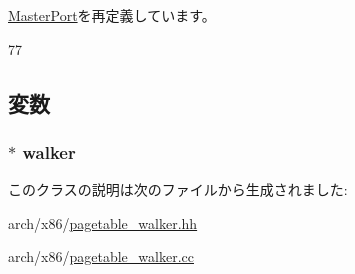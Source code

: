 \hyperlink{classMasterPort_ae43c73eff109f907118829fcfa9e7096}{MasterPort}を再定義しています。


\begin{DoxyCode}
77 { }
\end{DoxyCode}


\subsection{変数}
\hypertarget{classX86ISA_1_1Walker_1_1WalkerPort_a54537e5fcbe2d6f609ca4c90a48a06a8}{
\subsubsection[{walker}]{$\ast$ {\bf walker}}}
\label{classX86ISA_1_1Walker_1_1WalkerPort_a54537e5fcbe2d6f609ca4c90a48a06a8}


このクラスの説明は次のファイルから生成されました:\begin{DoxyCompactItemize}
\item 
arch/x86/\hyperlink{pagetable__walker_8hh}{pagetable\_\-walker.hh}\item 
arch/x86/\hyperlink{pagetable__walker_8cc}{pagetable\_\-walker.cc}\end{DoxyCompactItemize}
